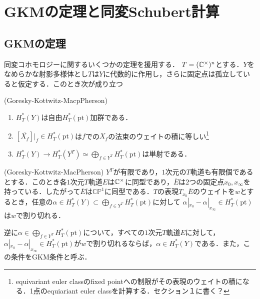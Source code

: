 \section{GKMの定理と同変Schubert計算}
\subsection{GKMの定理}
同変コホモロジーに関するいくつかの定理を援用する．
$T=(\mathbb{C}^\times)^n$とする．$Y$をなめらかな射影多様体とし$T$は$Y$に代数的に作用し，さらに固定点は孤立していると仮定する．このとき次が成り立つ

\begin{theo}(Goresky-Kottwitz-MacpPherson)\label{restriction to fixed point}
  \begin{enumerate}
    \item $H^*_T(Y)$は自由$H^*_T(\text{pt})$加群である．
    \item $[\overline{X_f}]|_f\in H^*_T(\text{pt})$は$f$での$X_f$の法束のウェイトの積に等しい\footnote{equivariant euler classのfixed pointへの制限がその表現のウェイトの積になる．1点のequiariant euler classを計算する．セクション１に書く？}
    \item $H^*_T(Y)\rightarrow H^*_T(Y^T) \simeq \bigoplus_{f\in Y^T}H^*_T(\text{pt})$は単射である．
  \end{enumerate}
\end{theo}

\begin{theo}(Goresky-Kottwitz-MacPherson\cite{GKM})\label{gkm theorem}
  $Y^T$が有限であり，$1$次元の$T$軌道も有限個であるとする．このとき各$1$次元$T$軌道$E$は$\mathbb{C}^\times$に同型であり，$\overline{E}$は$2$つの固定点$x_0,x_\infty$を持っている．したがって$\overline{E}$は$\mathbb{CP}^1$に同型である．$T$の表現$T_{x_0}\overline{E}$のウェイトを$w$とするとき，任意の$\alpha\in H^*_T(Y)\subset \bigoplus_{f\in Y^T}H^*_T(\text{pt})$に対して
  $\alpha|_{x_0} - \alpha|_{x_\infty}\in H^*_T(\text{pt})$は$w$で割り切れる．
  
  逆に$\alpha\in \bigoplus_{f\in Y^T}H^*_T(\text{pt})$について，すべての$1$次元$T$軌道$E$に対して，$\alpha|_{x_0} - \alpha|_{x_\infty}\in H^*_T(\text{pt})$が$w$で割り切れるならば，$\alpha\in H^*_T(Y)$である．また，この条件をGKM条件と呼ぶ．
\end{theo}


